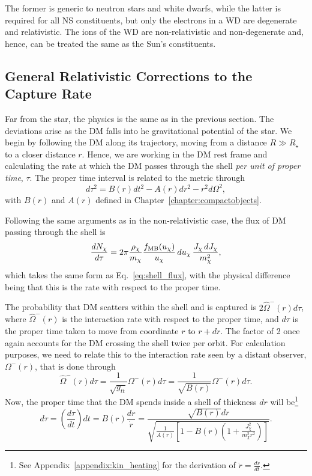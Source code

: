 The former is generic to neutron stars and white dwarfs, while the latter is required for all NS constituents, but only the electrons in a WD are degenerate and relativistic. The ions of the WD are non-relativistic and non-degenerate and, hence, can be treated the same as the Sun's constituents. 

\subsection{General Relativistic Corrections to the Capture Rate}

Far from the star, the physics is the same as in the previous section. The deviations arise as the DM falls into he gravitational potential of the star. We begin by following the DM along its trajectory, moving from a distance $R\gg R_\star$ to a closer distance $r$. Hence, we are working in the DM rest frame and calculating the rate at which the DM passes through the shell \textit{per unit of proper time}, $\tau$. The proper time interval is related to the metric through
\begin{equation}
    d\tau^2 = B(r) dt^2 - A(r) dr^2 - r^2 d\Omega^2,
\end{equation}
with $B(r)$ and $A(r)$ defined in Chapter~\ref{chapter:compactobjects}. 

Following the same arguments as in the non-relativistic case, the flux of DM passing through the shell is 
\begin{equation}
    \frac{d N_\chi}{d\tau} = 2\pi \frac{\rho_\chi}{m_\chi}\frac{f_{\rm MB}(u_\chi)}{u_\chi}\,du_\chi\,\frac{J_\chi \, dJ_\chi}{m_\chi^2},
\end{equation}
which takes the same form as Eq.~\ref{eq:shell_flux}, with the physical difference being that this is the rate with respect to the proper time.

The probability that DM scatters within the shell and is captured is $2\hat{\Omega}^-(r) d\tau$,
where $\hat{\Omega}^-(r)$ is the interaction rate with respect to the proper time, and $d\tau$ is the proper time taken to move from coordinate $r$ to $r + dr$. The factor of 2 once again accounts for the DM crossing the shell twice per orbit. For calculation purposes, we need to relate this to the interaction rate seen by a distant observer, $\Omega^-(r)$, that is done through
\begin{equation}
    \hat{\Omega}^-(r) d\tau = \frac{1}{\sqrt{g_{tt}}}\Omega^-(r)d\tau= \frac{1}{\sqrt{B(r)}}\Omega^-(r)d\tau.
\end{equation}
Now, the proper time that the DM spends inside a shell of thickness $dr$ will be\footnote{See Appendix~\ref{appendix:kin_heating} for the derivation of $\dot r = \frac{dr}{dt}$.}
\begin{equation}
    d\tau = \left( \frac{d\tau}{dt}\right) dt = B(r) \frac{dr}{\dot r} = \frac{\sqrt{B(r)} dr}{\sqrt{\frac{1}{A(r)} \left[ 1 - B(r)\left( 1 + \frac{J_\chi^2}{m_\chi^2 r^2} \right) \right]}}.
\end{equation}

